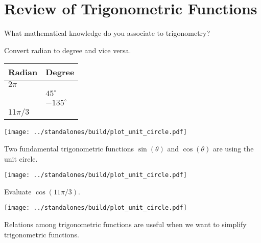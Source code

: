 \documentclass[../main.tex]{subfiles}
\begin{document}
 \section{Review of Trigonometric Functions}
  \faComments{} What mathematical knowledge do you associate to trigonometry?

  \begin{example}
    Convert radian to degree and vice versa. 

    \begin{minipage}{.4\textwidth}
      \begin{tabular}{p{1in} | p{1in}}
        Radian & Degree \\\midrule
        \(2\pi\) & \\[2ex] \midrule
                 & \(45^{\circ}\) \\[2ex] \midrule
                 & \(-135^{\circ}\) \\[2ex] \midrule
        \(11\pi/3\) & \\[2ex] \midrule
      \end{tabular}
    \end{minipage}
    \begin{minipage}{.59\textwidth}
      \texttt{[image: ../standalones/build/plot\_unit\_circle.pdf]}
    \end{minipage}
  \end{example}

  Two fundamental trigonometric functions \(\sin(\theta)\) and \(\cos(\theta)\) are  using the unit circle.

  \begin{minipage}{2.5in}
    \texttt{[image: ../standalones/build/plot\_unit\_circle.pdf]}
  \end{minipage}
  \begin{minipage}{4.5in}
  \end{minipage}

  \begin{example}
    Evaluate \(\cos(11\pi/3)\).

    \begin{minipage}{2.5in}
      \texttt{[image: ../standalones/build/plot\_unit\_circle.pdf]}
    \end{minipage}
    \begin{minipage}{4.5in}
    \end{minipage}
  \end{example}
  \clearpage

  Relations among trigonometric functions are useful when we want to simplify trigonometric functions. 
\end{document}
